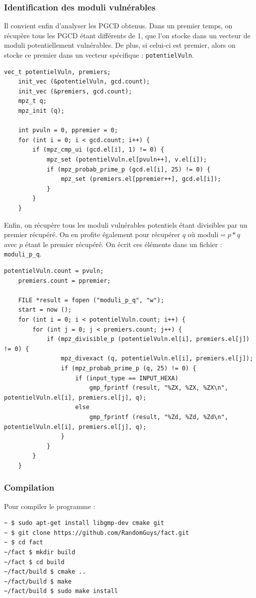 \subsubsection{Identification des moduli vulnérables}
Il convient enfin d'analyser les PGCD obtenus. Dans un premier temps, on récupère tous les PGCD étant différents de 1, que l'on stocke dans un vecteur de moduli potentiellement vulnérables. De plus, si celui-ci est premier, alors on stocke ce premier dans un vecteur spécifique : \verb+potentielVuln+. 

\begin{lstlisting}[style=customc,caption=fact\_superspeed.c - partie 5a, label=fact5]
	vec_t potentielVuln, premiers;
	init_vec (&potentielVuln, gcd.count);
	init_vec (&premiers, gcd.count);
	mpz_t q;
	mpz_init (q);
	
	int pvuln = 0, ppremier = 0;
	for (int i = 0; i < gcd.count; i++) {
		if (mpz_cmp_ui (gcd.el[i], 1) != 0) {
			mpz_set (potentielVuln.el[pvuln++], v.el[i]);
			if (mpz_probab_prime_p (gcd.el[i], 25) != 0) {
				mpz_set (premiers.el[ppremier++], gcd.el[i]);
			}
		}
	}
\end{lstlisting}


Enfin, on récupère tous les moduli vulnérables potentiels étant divisibles par un premier récupéré. On en profite également pour récupérer $q$ où $\text{moduli}=p*q$ avec $p$ étant le premier récupéré. On écrit ces éléments dans un fichier : \verb+moduli_p_q+. 
\begin{lstlisting}[style=customc,caption=fact\_superspeed.c - partie 5b, label=fact5]
    	potentielVuln.count = pvuln;
	premiers.count = ppremier;

	FILE *result = fopen ("moduli_p_q", "w");
	start = now ();
	for (int i = 0; i < potentielVuln.count; i++) {
		for (int j = 0; j < premiers.count; j++) {
			if (mpz_divisible_p (potentielVuln.el[i], premiers.el[j]) != 0) {
				mpz_divexact (q, potentielVuln.el[i], premiers.el[j]);
				if (mpz_probab_prime_p (q, 25) != 0) {
					if (input_type == INPUT_HEXA) 
						gmp_fprintf (result, "%ZX, %ZX, %ZX\n", potentielVuln.el[i], premiers.el[j], q);
					else
						gmp_fprintf (result, "%Zd, %Zd, %Zd\n", potentielVuln.el[i], premiers.el[j], q);
				}
			}
		}
	}

\end{lstlisting}






\subsubsection{Compilation}
Pour compiler le programme :
\begin{verbatim}
~ $ sudo apt-get install libgmp-dev cmake git 
~ $ git clone https://github.com/RandomGuys/fact.git
~ $ cd fact
~/fact $ mkdir build
~/fact $ cd build
~/fact/build $ cmake ..
~/fact/build $ make
~/fact/build $ sudo make install
\end{verbatim}

